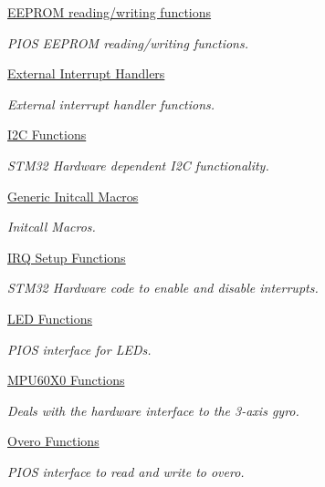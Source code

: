\begin{DoxyCompactItemize}
\hyperlink{group___p_i_o_s___e_e_p_r_o_m}{E\-E\-P\-R\-O\-M reading/writing functions}
\begin{DoxyCompactList}\small\item\em P\-I\-O\-S E\-E\-P\-R\-O\-M reading/writing functions. \end{DoxyCompactList}\item 
\hyperlink{group___p_i_o_s___e_x_t_i}{External Interrupt Handlers}
\begin{DoxyCompactList}\small\item\em External interrupt handler functions. \end{DoxyCompactList}\item 
\hyperlink{group___p_i_o_s___i2_c}{I2\-C Functions}
\begin{DoxyCompactList}\small\item\em S\-T\-M32 Hardware dependent I2\-C functionality. \end{DoxyCompactList}\item 
\hyperlink{group___p_i_o_s___i_n_i_t_c_a_l_l}{Generic Initcall Macros}
\begin{DoxyCompactList}\small\item\em Initcall Macros. \end{DoxyCompactList}\item 
\hyperlink{group___p_i_o_s___i_r_q}{I\-R\-Q Setup Functions}
\begin{DoxyCompactList}\small\item\em S\-T\-M32 Hardware code to enable and disable interrupts. \end{DoxyCompactList}\item 
\hyperlink{group___p_i_o_s___l_e_d}{L\-E\-D Functions}
\begin{DoxyCompactList}\small\item\em P\-I\-O\-S interface for L\-E\-Ds. \end{DoxyCompactList}\item 
\hyperlink{group___p_i_o_s___m_p_u60_x0}{M\-P\-U60\-X0 Functions}
\begin{DoxyCompactList}\small\item\em Deals with the hardware interface to the 3-\/axis gyro. \end{DoxyCompactList}\item 
\hyperlink{group___p_i_o_s___o_v_e_r_o}{Overo Functions}
\begin{DoxyCompactList}\small\item\em P\-I\-O\-S interface to read and write to overo. \end{DoxyCompactList}\item 

\end{DoxyCompactItemize}
